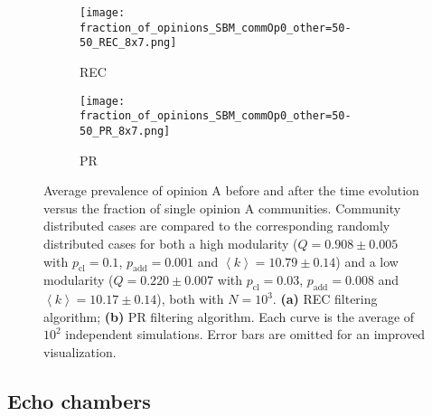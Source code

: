 \documentclass[11 pt , letterpaper , twoside , openright]{book}
\begin{document}
\begin{figure}[H]
  \begin{subfigure}[b]{0.49\textwidth}
    \caption{REC}
  	\texttt{[image: fraction\_of\_opinions\_SBM\_commOp0\_other=50-50\_REC\_8x7.png]}
    \label{rec_comm}
  \end{subfigure}
  \begin{subfigure}[b]{0.49\textwidth}
    \caption{PR}
  	\texttt{[image: fraction\_of\_opinions\_SBM\_commOp0\_other=50-50\_PR\_8x7.png]}
    \label{pr_comm}
  \end{subfigure}
  \captionsetup{format=plain}
  \caption[Average prevalence of opinion A before and after the time evolution versus the fraction of single opinion A communities. Community distributed cases are compared to the corresponding randomly distributed cases for both a high modularity and a low modularity network. Results for the REC and PR filtering algorithms.]{Average prevalence of opinion A before and after the time evolution versus the fraction of single opinion A communities. Community distributed cases are compared to the corresponding randomly distributed cases for both a high modularity ($Q = 0.908 \pm 0.005$ with $p_{\text{cl}} = 0.1$, $p_{\text{add}} = 0.001$ and $\left<k\right> = 10.79 \pm 0.14$) and a low modularity ($Q = 0.220 \pm 0.007$ with $p_{\text{cl}} = 0.03$, $p_{\text{add}} = 0.008$ and $\left<k\right> = 10.17 \pm 0.14$), both with $N=10^3$. \textbf{(a)} REC filtering algorithm; \textbf{(b)} PR filtering algorithm. Each curve is the average of $10^2$ independent simulations. Error bars are omitted for an improved visualization. }
\label{fracOp0_vs_commOp0_other_50-50}
\end{figure}

\subsection{Echo chambers}\label{groupVSrandomECHO}
\end{document}
